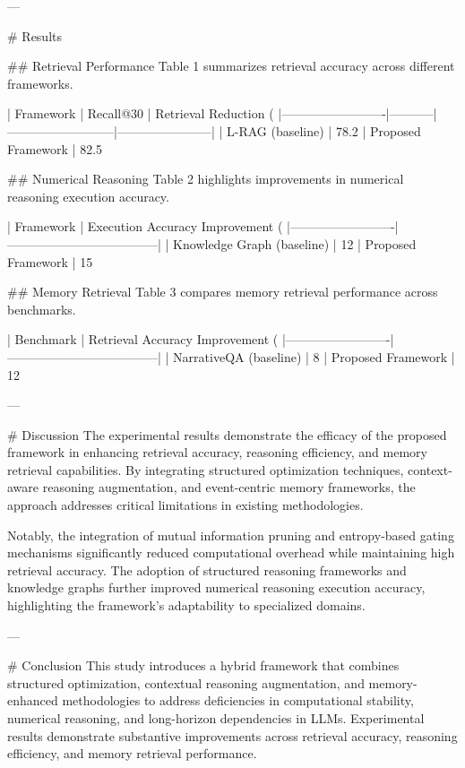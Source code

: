---

# Results  

## Retrieval Performance  
Table 1 summarizes retrieval accuracy across different frameworks.  

| Framework              | Recall@30 | Retrieval Reduction (%
|-------------------------|-----------|--------------------------|-----------------------|  
| L-RAG (baseline)        | 78.2%
| Proposed Framework      | 82.5%

## Numerical Reasoning  
Table 2 highlights improvements in numerical reasoning execution accuracy.  

| Framework              | Execution Accuracy Improvement (%
|-------------------------|------------------------------------|  
| Knowledge Graph (baseline) | 12%
| Proposed Framework         | 15%

## Memory Retrieval  
Table 3 compares memory retrieval performance across benchmarks.  

| Benchmark              | Retrieval Accuracy Improvement (%
|-------------------------|------------------------------------|  
| NarrativeQA (baseline) | 8%
| Proposed Framework     | 12%

---

# Discussion  
The experimental results demonstrate the efficacy of the proposed framework in enhancing retrieval accuracy, reasoning efficiency, and memory retrieval capabilities. By integrating structured optimization techniques, context-aware reasoning augmentation, and event-centric memory frameworks, the approach addresses critical limitations in existing methodologies.  

Notably, the integration of mutual information pruning and entropy-based gating mechanisms significantly reduced computational overhead while maintaining high retrieval accuracy. The adoption of structured reasoning frameworks and knowledge graphs further improved numerical reasoning execution accuracy, highlighting the framework's adaptability to specialized domains.  

---

# Conclusion  
This study introduces a hybrid framework that combines structured optimization, contextual reasoning augmentation, and memory-enhanced methodologies to address deficiencies in computational stability, numerical reasoning, and long-horizon dependencies in LLMs. Experimental results demonstrate substantive improvements across retrieval accuracy, reasoning efficiency, and memory retrieval performance.  

